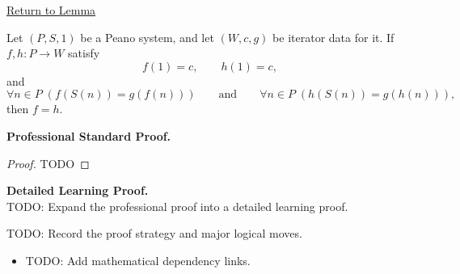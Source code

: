 \newpage
{}
\label{prf:uniqueness-of-iterator-functions}

\begin{remark*}[Return]
\hyperref[lem:uniqueness-of-iterator-functions]{Return to Lemma}
\end{remark*}

\begin{theorem*}
Let $(P,S,1)$ be a Peano system, and let $(W,c,g)$ be iterator data for it. If
$f,h:P\to W$ satisfy
\[
f(1)=c,\qquad h(1)=c,
\]
and
\[
\forall n\in P\;(f(S(n))=g(f(n)))
\qquad\text{and}\qquad
\forall n\in P\;(h(S(n))=g(h(n))),
\]
then $f=h$.
\end{theorem*}

\textbf{Professional Standard Proof.}~\\
\begin{proof}
TODO
\end{proof}

\textbf{Detailed Learning Proof.}~\\
TODO: Expand the professional proof into a detailed learning proof.

\begin{remark*}
TODO: Record the proof strategy and major logical moves.
\end{remark*}

\begin{dependencies}
\begin{itemize}
  \item TODO: Add mathematical dependency links.
\end{itemize}
\end{dependencies}
